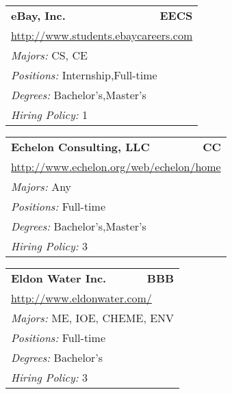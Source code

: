 \documentclass[twoside]{article}
\begin{document}
\begin{center}
\begin{multicols}{3}
\begin{FlushLeft}
\begin{minipage}{.9\columnwidth}
\end{minipage}
 
\begin{minipage}{.9\columnwidth}\begin{tabularx}{.95\columnwidth}{Xr}
                 {\Large\bf eBay, Inc.} & {\Large\bf EECS}\\
    \multicolumn{2}{p{.95\columnwidth}}{\url{http://www.students.ebaycareers.com}}\\
    \multicolumn{2}{p{.95\columnwidth}}{\emph{Majors:} CS, CE}\\
    \multicolumn{2}{p{.95\columnwidth}}{\emph{Positions:} Internship,Full-time}\\
    \multicolumn{2}{p{.95\columnwidth}}{\emph{Degrees:} Bachelor's,Master's}\\
    \multicolumn{2}{p{.95\columnwidth}}{\emph{Hiring Policy:} 1}\\
    \end{tabularx}
    
\end{minipage}
 
\begin{minipage}{.9\columnwidth}\begin{tabularx}{.95\columnwidth}{Xr}
                 {\Large\bf Echelon Consulting, LLC} & {\Large\bf CC}\\
    \multicolumn{2}{p{.95\columnwidth}}{\url{http://www.echelon.org/web/echelon/home}}\\
    \multicolumn{2}{p{.95\columnwidth}}{\emph{Majors:} Any}\\
    \multicolumn{2}{p{.95\columnwidth}}{\emph{Positions:} Full-time}\\
    \multicolumn{2}{p{.95\columnwidth}}{\emph{Degrees:} Bachelor's,Master's}\\
    \multicolumn{2}{p{.95\columnwidth}}{\emph{Hiring Policy:} 3}\\
    \end{tabularx}
    
\end{minipage}
 
\begin{minipage}{.9\columnwidth}\begin{tabularx}{.95\columnwidth}{Xr}
                 {\Large\bf Eldon Water Inc.} & {\Large\bf BBB}\\
    \multicolumn{2}{p{.95\columnwidth}}{\url{http://www.eldonwater.com/}}\\
    \multicolumn{2}{p{.95\columnwidth}}{\emph{Majors:} ME, IOE, CHEME, ENV}\\
    \multicolumn{2}{p{.95\columnwidth}}{\emph{Positions:} Full-time}\\
    \multicolumn{2}{p{.95\columnwidth}}{\emph{Degrees:} Bachelor's}\\
    \multicolumn{2}{p{.95\columnwidth}}{\emph{Hiring Policy:} 3}\\
    \end{tabularx}
    

\end{minipage}
\end{FlushLeft}
\end{multicols}
\end{center}
\end{document}
